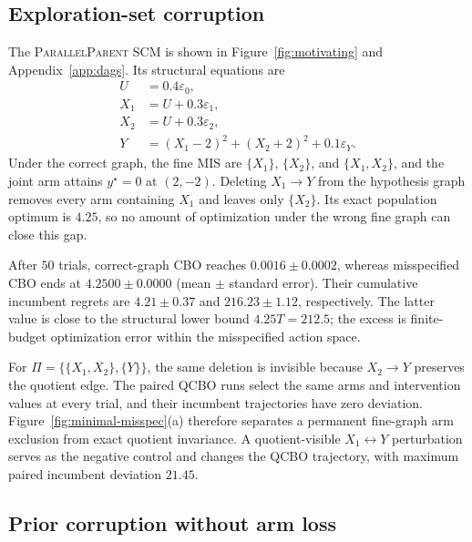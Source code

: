 \documentclass[twoside]{article}
\begin{document}
\subsection{Exploration-set corruption}
\label{sec:exp-a}

The \textsc{ParallelParent} SCM is shown in Figure~\ref{fig:motivating} and Appendix~\ref{app:dags}. Its structural equations are
\begin{equation}
 \begin{aligned}
 U&=0.4\varepsilon_0,\\ X_1&=U+0.3\varepsilon_1,\\
 X_2&=U+0.3\varepsilon_2,\\
 Y&=(X_1-2)^2+(X_2+2)^2
  +0.1\varepsilon_Y.
 \end{aligned}
 \label{eq:parallel-parent-scm}
\end{equation}
Under the correct graph, the fine MIS are $\{X_1\}$, $\{X_2\}$, and $\{X_1,X_2\}$, and the joint arm attains $y^\star=0$ at $(2,-2)$. Deleting $X_1\to Y$ from the hypothesis graph removes every arm containing $X_1$ and leaves only $\{X_2\}$. Its exact population optimum is $4.25$, so no amount of optimization under the wrong fine graph can close this gap.

After $50$ trials, correct-graph CBO reaches $0.0016\pm0.0002$, whereas misspecified CBO ends at $4.2500\pm0.0000$ (mean $\pm$ standard error). Their cumulative incumbent regrets are $4.21\pm0.37$ and $216.23\pm1.12$, respectively. The latter value is close to the structural lower bound $4.25T=212.5$; the excess is finite-budget optimization error within the misspecified action space.

For $\Pi=\{\{X_1,X_2\},\{Y\}\}$, the same deletion is invisible because $X_2\to Y$ preserves the quotient edge. The paired QCBO runs select the same arms and intervention values at every trial, and their incumbent trajectories have zero deviation. Figure~\ref{fig:minimal-misspec}(a) therefore separates a permanent fine-graph arm exclusion from exact quotient invariance. A quotient-visible $X_1\leftrightarrow Y$ perturbation serves as the negative control and changes the QCBO trajectory, with maximum paired incumbent deviation $21.45$.

\subsection{Prior corruption without arm loss}
\label{sec:exp-b}
\end{document}
